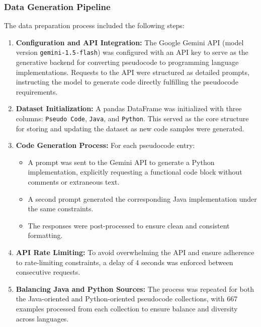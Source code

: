 \documentclass{dhbenelux}
\begin{document}
\subsubsection{Data Generation Pipeline}
The data preparation process included the following steps:
\begin{enumerate}
  \item \textbf{Configuration and API Integration:} The Google Gemini API (model version \texttt{gemini-1.5-flash}) was configured with an API key to serve as the generative backend for converting pseudocode to programming language implementations. Requests to the API were structured as detailed prompts, instructing the model to generate code directly fulfilling the pseudocode requirements.
  \item \textbf{Dataset Initialization:} A pandas DataFrame was initialized with three columns: \texttt{Pseudo Code}, \texttt{Java}, and \texttt{Python}. This served as the core structure for storing and updating the dataset as new code samples were generated.
  \item \textbf{Code Generation Process:} For each pseudocode entry:
    \begin{itemize}
        \item A prompt was sent to the Gemini API to generate a Python implementation, explicitly requesting a functional code block without comments or extraneous text.
        \item A second prompt generated the corresponding Java implementation under the same constraints.
        \item The responses were post-processed to ensure clean and consistent formatting.
    \end{itemize}
  \item \textbf{API Rate Limiting:} To avoid overwhelming the API and ensure adherence to rate-limiting constraints, a delay of 4 seconds was enforced between consecutive requests.
  \item \textbf{Balancing Java and Python Sources:} The process was repeated for both the Java-oriented and Python-oriented pseudocode collections, with 667 examples processed from each collection to ensure balance and diversity across languages.
\end{enumerate}
\end{document}
